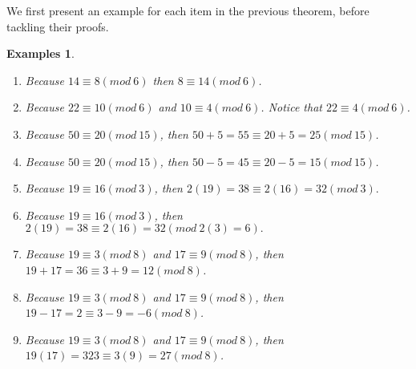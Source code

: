 \documentclass[12pt,letterpaper]{book}
\newtheorem{examples}{Examples}
\begin{document}
We first present an example for each item in the previous theorem, before tackling their proofs.

\begin{examples}
~
\begin{enumerate}
\item{Because $ 14\equiv 8(mod\  6)$ then $8 \equiv 14 (mod\ 6)$.}
\item{Because $22\equiv 10(mod \ 6)$ and $10 \equiv 4(mod \ 6)$.
Notice that $22\equiv 4(mod \ 6)$.}\item{Because $50\equiv 20 (mod\
15)$, then $50+5=55\equiv 20+5=25(mod\ 15)$.}\item{Because $50\equiv
20 (mod\ 15)$, then $50-5=45\equiv 20-5=15(mod\ 15)$.}\item{Because
$19\equiv 16(mod \ 3)$, then $2(19)=38\equiv 2(16)=32(mod \
3).$}\item{Because $19\equiv 16(mod \ 3)$, then $2(19)=38\equiv
2(16)=32(mod \ 2(3)=6).$}\item{Because $19\equiv 3 (mod \ 8)$ and
$17\equiv 9(mod \ 8)$, then $19+17=36\equiv 3+9=12(mod \
8)$}.\item{Because $19\equiv 3 (mod \ 8)$ and $17\equiv 9(mod \ 8)$,
then $19-17=2\equiv 3-9=-6(mod \ 8)$}.\item{Because $19\equiv 3 (mod
\ 8)$ and $17\equiv 9(mod \ 8)$, then $19(17)=323\equiv 3(9)=27(mod
\ 8)$}.
\end{enumerate}

\end{examples}
\end{document}

